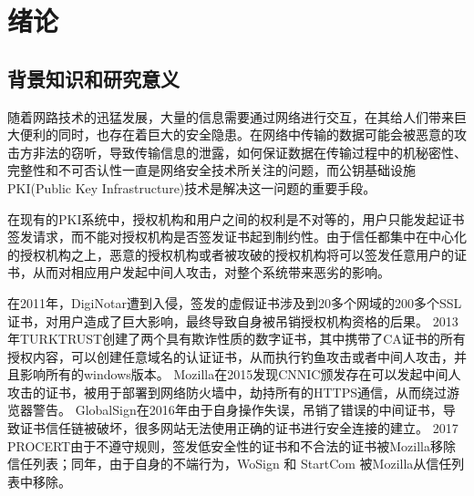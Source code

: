 
\chapter{绪论}

\section{背景知识和研究意义}

随着网路技术的迅猛发展，大量的信息需要通过网络进行交互，在其给人们带来巨大便利的同时，也存在着巨大的安全隐患。在网络中传输的数据可能会被恶意的攻击方非法的窃听，导致传输信息的泄露，如何保证数据在传输过程中的机秘密性、完整性和不可否认性一直是网络安全技术所关注的问题，而公钥基础设施PKI(Public Key Infrastructure)技术是解决这一问题的重要手段。






在现有的PKI系统中，授权机构和用户之间的权利是不对等的，用户只能发起证书签发请求，而不能对授权机构是否签发证书起到制约性。由于信任都集中在中心化的授权机构之上，恶意的授权机构或者被攻破的授权机构将可以签发任意用户的证书，从而对相应用户发起中间人攻击，对整个系统带来恶劣的影响。

在2011年，DigiNotar遭到入侵，签发的虚假证书涉及到20多个网域的200多个SSL证书\cite{prins2011diginotar}，对用户造成了巨大影响，最终导致自身被吊销授权机构资格的后果。
2013年TURKTRUST创建了两个具有欺诈性质的数字证书，其中携带了CA证书的所有授权内容，可以创建任意域名的认证证书，从而执行钓鱼攻击或者中间人攻击，并且影响所有的windows版本。%
Mozilla在2015发现CNNIC颁发存在可以发起中间人攻击的证书，被用于部署到网络防火墙中，劫持所有的HTTPS通信，从而绕过游览器警告。
GlobalSign在2016年由于自身操作失误，吊销了错误的中间证书，导致证书信任链被破坏，很多网站无法使用正确的证书进行安全连接的建立。
2017 PROCERT由于不遵守规则，签发低安全性的证书和不合法的证书被Mozilla移除信任列表；同年，由于自身的不端行为，WoSign 和 StartCom 被Mozilla从信任列表中移除。


